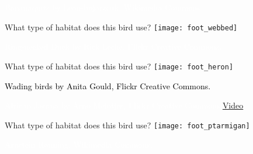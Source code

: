 {
\begin{frame}[b,plain]
	\hfill\tiny\textcolor{white}{Bananaquits by Leon-bojarzcuk, Wikimedia Commons.}
\end{frame}
}

{
\begin{frame}[c,plain]{What type of habitat does this bird use?}
	\centering
	\texttt{[image: foot\_webbed]}\par
\end{frame}
}

{
\begin{frame}[b,plain]
	\tiny\textcolor{white}{Ring-necked Duck by Rick Leche, Flickr Creative Commons.}
\end{frame}
}

{
\begin{frame}[c,plain]{What type of habitat does this bird use?}
	\centering
	\texttt{[image: foot\_heron]}\par
\end{frame}
}

{
\begin{frame}[b,plain]
	\tiny\textcolor{black}{Wading birds by Anita Gould, Flickr Creative Commons.}
\end{frame}
}

{
\begin{frame}[b,plain]
	\tiny\textcolor{white}{African Jacana by Arno Meintjes, Flickr Creative Commons.\hfill\href{http://www.youtube.com/watch?v=yVMOZhpVK2g}{Video}}
\end{frame}
}

{
\begin{frame}[c,plain]{What type of habitat does this bird use?}
	\centering
	\texttt{[image: foot\_ptarmigan]}\par
\end{frame}
}

{
\begin{frame}[b,plain]
	\hfill\tiny\textcolor{white}{Arnstein Rønning, Wikimedia Commons.}
\end{frame}
}


